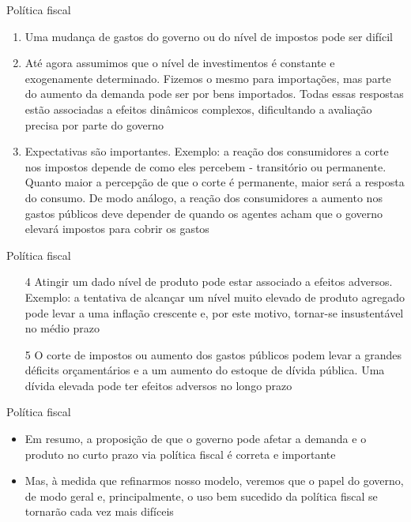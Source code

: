 \documentclass[10pt]{beamer}
\begin{document}
\begin{frame}{Política fiscal}
    \begin{enumerate}
        \item Uma mudança de gastos do governo ou do nível de impostos pode ser difícil\bigskip

        \item Até agora assumimos que o nível de investimentos é constante e exogenamente determinado. Fizemos o mesmo para importações, mas parte do aumento da demanda pode ser por bens importados. Todas essas respostas estão associadas a efeitos dinâmicos complexos, dificultando a avaliação precisa por parte do governo\bigskip

        \item Expectativas são importantes. Exemplo: a reação dos consumidores a corte nos impostos depende de como eles percebem - transitório ou permanente. Quanto maior a percepção de que o corte é permanente, maior será a resposta do consumo. De modo análogo, a reação dos consumidores a aumento nos gastos públicos deve depender de quando os agentes acham que o governo elevará impostos para cobrir os gastos

    \end{enumerate}
\end{frame}

\begin{frame}{Política fiscal}
    \begin{enumerate}

        \item[4] Atingir um dado nível de produto pode estar associado a efeitos adversos. Exemplo: a tentativa de alcançar um nível muito elevado de produto agregado pode levar a uma inflação crescente e, por este motivo, tornar-se insustentável no médio prazo\bigskip

        \item[5] O corte de impostos ou aumento dos gastos públicos podem levar a grandes déficits orçamentários e a um aumento do estoque de dívida pública. Uma dívida elevada pode ter efeitos adversos no longo prazo
    \end{enumerate}
\end{frame}

\begin{frame}{Política fiscal}
    \begin{itemize}
        \item Em resumo, a proposição de que o governo pode afetar a demanda e o produto no curto prazo via política fiscal é correta e importante\bigskip

        \item Mas, à medida que refinarmos nosso modelo, veremos que o papel do governo, de modo geral e, principalmente, o uso bem sucedido da política fiscal se tornarão cada vez mais difíceis
    \end{itemize}
\end{frame}
\end{document}
